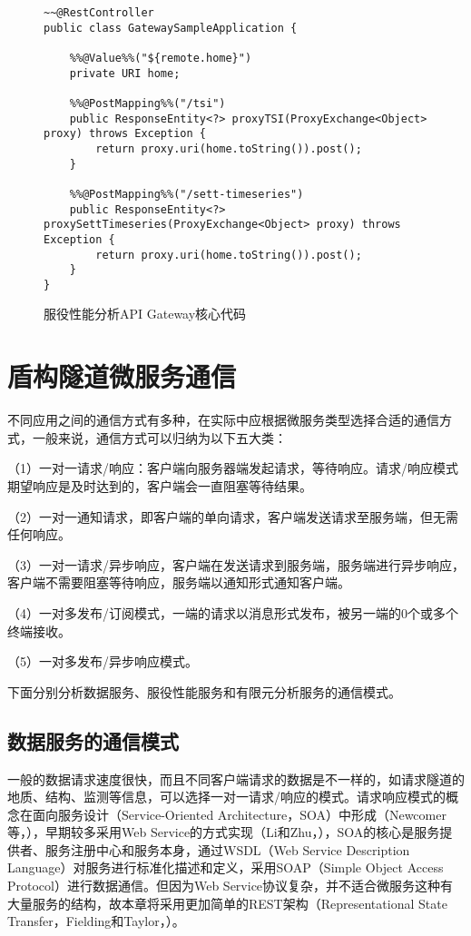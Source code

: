 \begin{figure}[htb!]
\centering
\begin{minipage}[t]{1.0\linewidth}
\begin{lstlisting}
~~@RestController
public class GatewaySampleApplication {

	%%@Value%%("${remote.home}")
	private URI home;

	%%@PostMapping%%("/tsi")
	public ResponseEntity<?> proxyTSI(ProxyExchange<Object> proxy) throws Exception {
		return proxy.uri(home.toString()).post();
	}

	%%@PostMapping%%("/sett-timeseries")
	public ResponseEntity<?> proxySettTimeseries(ProxyExchange<Object> proxy) throws Exception {
		return proxy.uri(home.toString()).post();
	}
}
\end{lstlisting}
\end{minipage} 
\caption{服役性能分析API Gateway核心代码}
\label{fig:服役性能分析APIGateway核心代码}
\end{figure}

\section{盾构隧道微服务通信}

不同应用之间的通信方式有多种，在实际中应根据微服务类型选择合适的通信方式，一般来说，通信方式可以归纳为以下五大类：

（1）一对一请求/响应：客户端向服务器端发起请求，等待响应。请求/响应模式期望响应是及时达到的，客户端会一直阻塞等待结果。

（2）一对一通知请求，即客户端的单向请求，客户端发送请求至服务端，但无需任何响应。

（3）一对一请求/异步响应，客户端在发送请求到服务端，服务端进行异步响应，客户端不需要阻塞等待响应，服务端以通知形式通知客户端。

（4）一对多发布/订阅模式，一端的请求以消息形式发布，被另一端的0个或多个终端接收。

（5）一对多发布/异步响应模式。

下面分别分析数据服务、服役性能服务和有限元分析服务的通信模式。

\subsection{数据服务的通信模式}

一般的数据请求速度很快，而且不同客户端请求的数据是不一样的，如请求隧道的地质、结构、监测等信息，可以选择一对一请求/响应的模式。请求响应模式的概念在面向服务设计（Service-Oriented Architecture，SOA）中形成（Newcomer等，\citeyear{newcomer2005understanding}），早期较多采用Web Service的方式实现（Li和Zhu，\citeyear{li2013development}），SOA的核心是服务提供者、服务注册中心和服务本身，通过WSDL（Web Service Description Language）对服务进行标准化描述和定义，采用SOAP（Simple Object Access Protocol）进行数据通信。但因为Web Service协议复杂，并不适合微服务这种有大量服务的结构，故本章将采用更加简单的REST架构（Representational State Transfer，Fielding和Taylor，\citeyear{fielding2000architectural}）。

